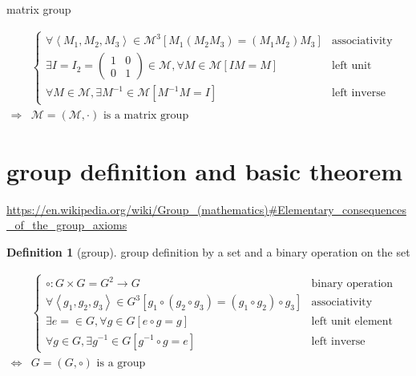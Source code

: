\documentclass[
]{book}
\theoremstyle{definition}
\newtheorem{definition}{Definition}[chapter]
\theoremstyle{definition}
\theoremstyle{definition}
\theoremstyle{definition}
\theoremstyle{remark}
\begin{document}
matrix group

\[
\begin{aligned}
 & \begin{cases}
\forall\left\langle M_{{\scriptscriptstyle 1}},M_{{\scriptscriptstyle 2}},M_{{\scriptscriptstyle 3}}\right\rangle \in\mathcal{M}^{3}\left[M_{{\scriptscriptstyle 1}}\left(M_{{\scriptscriptstyle 2}}M_{{\scriptscriptstyle 3}}\right)=\left(M_{{\scriptscriptstyle 1}}M_{{\scriptscriptstyle 2}}\right)M_{{\scriptscriptstyle 3}}\right] & \text{associativity}\\
\exists I=I_{2}=\begin{pmatrix}1 & 0\\
0 & 1
\end{pmatrix}\in\mathcal{M},\forall M\in\mathcal{M}\left[IM=M\right] & \text{left unit element}\\
\forall M\in\mathcal{M},\exists M^{-1}\in\mathcal{M}\left[M^{-1}M=I\right] & \text{left inverse (element)}
\end{cases}\\
\Rightarrow & \mathcal{M}=\left(\mathcal{M},\cdot\right)\text{ is a matrix group}
\end{aligned}
\]

\section{group definition and basic theorem}\label{group-definition-and-basic-theorem}

\url{https://en.wikipedia.org/wiki/Group_(mathematics)\#Elementary_consequences_of_the_group_axioms}

\begin{definition}[group]
\protect\hypertarget{def:unnamed-chunk-1}{}\label{def:unnamed-chunk-1}group definition by a set and a binary operation on the set
\end{definition}

\[
\begin{aligned}
 & \begin{cases}
\circ:G\times G=G^{2}\rightarrow G & \text{binary operation}\\
\forall\left\langle g_{{\scriptscriptstyle 1}},g_{{\scriptscriptstyle 2}},g_{{\scriptscriptstyle 3}}\right\rangle \in G^{3}\left[g_{{\scriptscriptstyle 1}}\circ\left(g_{{\scriptscriptstyle 2}}\circ g_{{\scriptscriptstyle 3}}\right)=\left(g_{{\scriptscriptstyle 1}}\circ g_{{\scriptscriptstyle 2}}\right)\circ g_{{\scriptscriptstyle 3}}\right] & \text{associativity}\\
\exists e=\in G,\forall g\in G\left[e\circ g=g\right] & \text{left unit element}\\
\forall g\in G,\exists g^{-1}\in G\left[g^{-1}\circ g=e\right] & \text{left inverse (element)}
\end{cases}\\
\Leftrightarrow & G=\left(G,\circ\right)\text{ is a group}
\end{aligned}
\]
\end{document}
